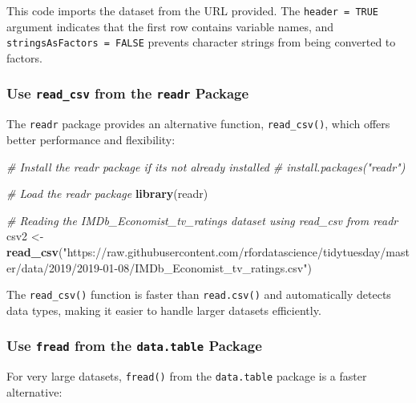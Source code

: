 \documentclass[
]{book}
\newenvironment{Shaded}{\begin{snugshade}}{\end{snugshade}}
\newcommand{\CommentTok}[1]{\textcolor[rgb]{0.56,0.35,0.01}{\textit{#1}}}
\newcommand{\FunctionTok}[1]{\textcolor[rgb]{0.13,0.29,0.53}{\textbf{#1}}}
\newcommand{\NormalTok}[1]{#1}
\newcommand{\OtherTok}[1]{\textcolor[rgb]{0.56,0.35,0.01}{#1}}
\newcommand{\StringTok}[1]{\textcolor[rgb]{0.31,0.60,0.02}{#1}}
\begin{document}
This code imports the dataset from the URL provided. The \texttt{header\ =\ TRUE} argument indicates that the first row contains variable names, and \texttt{stringsAsFactors\ =\ FALSE} prevents character strings from being converted to factors.

\subsubsection*{\texorpdfstring{Use \texttt{read\_csv} from the \texttt{readr} Package}{Use read\_csv from the readr Package}}\label{use-read_csv-from-the-readr-package}

The \texttt{readr} package provides an alternative function, \texttt{read\_csv()}, which offers better performance and flexibility:

\begin{Shaded}
\begin{Highlighting}[]
\CommentTok{\# Install the readr package if it\textquotesingle{}s not already installed}
\CommentTok{\# install.packages("readr")}

\CommentTok{\# Load the readr package}
\FunctionTok{library}\NormalTok{(readr)}

\CommentTok{\# Reading the IMDb\_Economist\_tv\_ratings dataset using read\_csv from readr}
\NormalTok{csv2 }\OtherTok{\textless{}{-}} \FunctionTok{read\_csv}\NormalTok{(}\StringTok{"https://raw.githubusercontent.com/rfordatascience/tidytuesday/master/data/2019/2019{-}01{-}08/IMDb\_Economist\_tv\_ratings.csv"}\NormalTok{)}
\end{Highlighting}
\end{Shaded}

The \texttt{read\_csv()} function is faster than \texttt{read.csv()} and automatically detects data types, making it easier to handle larger datasets efficiently.

\subsubsection*{\texorpdfstring{Use \texttt{fread} from the \texttt{data.table} Package}{Use fread from the data.table Package}}\label{use-fread-from-the-data.table-package}

For very large datasets, \texttt{fread()} from the \texttt{data.table} package is a faster alternative:
\end{document}
